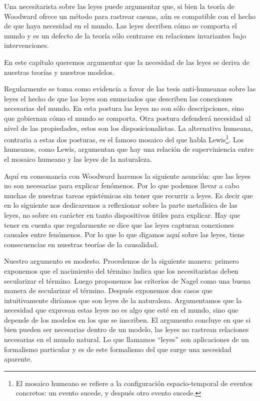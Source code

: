 Una necesitarista sobre las leyes puede argumentar que, si bien la teoría de Woodward ofrece un método para rastrear casuas, aún es compatible con el hecho de que haya necesidad en el mundo. Las leyes decriben cómo se comporta el mundo y es un defecto de la teoría sólo centrarse en relaciones invariantes bajo intervenciones.

En este capítulo queremos argumentar que la necesidad de las leyes se deriva de nuestras teorías y nuestros modelos.

Regularmente se toma como evidencia a favor de las tesis anti-humeanas sobre las leyes el hecho de que las leyes son enunciados que describen las conexiones necesarias del mundo. En esta postura las leyes no son sólo descripciones, sino que gobiernan cómo el mundo se comporta\cite{Bhogal2020}. Otra postura defenderá necesidad al nivel de las propiedades, estos son los disposicionalistas. La alternativa humeana, contraria a estas dos posturas, es el famoso mosaico del que habla Lewis\footnote{El mosaico humeano se refiere a la configuración espacio-temporal de eventos concretos: un evento sucede, y después otro evento sucede.}. Los humeanos, como Lewis, argumentan que hay una relación de superviniencia entre el mosaico humeano y las leyes de la naturaleza.

Aquí en consonancia con Woodward haremos la siguiente asunción: que las leyes no son necesarias para explicar fenómenos. Por lo que podemos llevar a cabo muchas de nuestras tareas epistémicas sin tener que recurrir a leyes. Es decir que en lo siguiente nos dedicaremos a reflexionar sobre la parte metafísica de las leyes, no sobre su carácter en tanto dispositivos útiles para explicar. Hay que tener en cuenta que regularmente se dice que las leyes capturan conexiones causales entre fenómenos. Por lo que lo que digamos aquí sobre las leyes, tiene consecuencias en nuestras teorías de la causalidad.

Nuestro argumento es modesto. Procedemos de la siguiente manera: primero exponemos que el nacimiento del término indica que los necesitaristas deben secularizar el término. Luego proponemos los criterios de Nagel como una buena manera de secularizar el término. Después exponemos dos casos que intuitivamente diríamos que son leyes de la naturaleza. Argumentamos que la necesidad que expresan estas leyes no es algo que esté en el mundo, sino que depende de los modelos en los que se inscriben. El argumento concluye en que si bien pueden ser necesarias dentro de un modelo, las leyes no rastrean relaciones necesarias en el mundo natural. Lo que llamamos ``leyes'' son aplicaciones de un formalismo particular y es de este formalismo del que surge una necesidad aparente.

